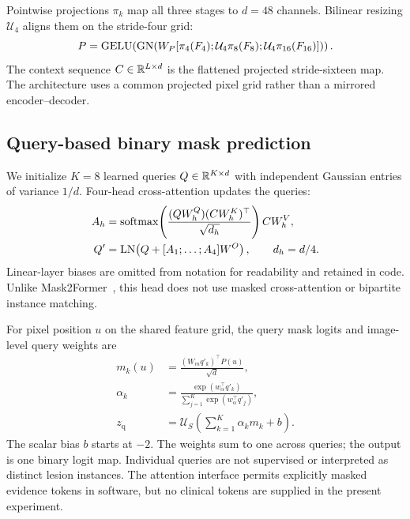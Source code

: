 Pointwise projections $\pi_k$ map all three stages to $d=48$ channels. Bilinear resizing $\mathcal U_{4}$ aligns them on the stride-four grid:
\begin{equation}
 P=\operatorname{GELU}\!\left(\operatorname{GN}\!\left(W_P
 [\pi_4(F_4);\mathcal U_4\pi_8(F_8);\mathcal U_4\pi_{16}(F_{16})]\right)\right).
\end{equation}
The context sequence $C\in\mathbb{R}^{L\times d}$ is the flattened projected stride-sixteen map. The architecture uses a common projected pixel grid rather than a mirrored encoder--decoder.

\subsection{Query-based binary mask prediction}
We initialize $K=8$ learned queries $Q\in\mathbb{R}^{K\times d}$ with independent Gaussian entries of variance $1/d$. Four-head cross-attention updates the queries:
\begin{align}
 A_h&=\operatorname{softmax}\!\left(\frac{(QW_h^Q)(CW_h^K)^\top}{\sqrt{d_h}}\right)CW_h^V,\\
 Q'&=\operatorname{LN}\!\left(Q+[A_1;\ldots;A_4]W^O\right),\qquad d_h=d/4.
\end{align}
Linear-layer biases are omitted from notation for readability and retained in code. Unlike Mask2Former~\cite{cheng2022}, this head does not use masked cross-attention or bipartite instance matching.

For pixel position $u$ on the shared feature grid, the query mask logits and image-level query weights are
\begin{align}
 m_k(u)&=\frac{(W_mq'_k)^\top P(u)}{\sqrt d},\\
 \alpha_k&=\frac{\exp(w_\alpha^\top q'_k)}{\sum_{j=1}^{K}\exp(w_\alpha^\top q'_j)},\\
 z_{\mathrm q}&=\mathcal U_S\!\left(\sum_{k=1}^{K}\alpha_km_k+b\right).
\end{align}
The scalar bias $b$ starts at $-2$. The weights sum to one across queries; the output is one binary logit map. Individual queries are not supervised or interpreted as distinct lesion instances. The attention interface permits explicitly masked evidence tokens in software, but no clinical tokens are supplied in the present experiment.

